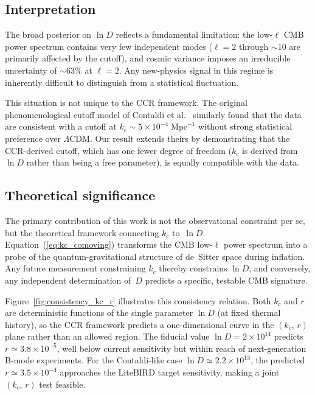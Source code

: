 \subsection{Interpretation}

The broad posterior on $\ln D$ reflects a fundamental limitation: the
low-$\ell$ CMB power spectrum contains very few independent modes
($\ell = 2$ through $\sim 10$ are primarily affected by the cutoff),
and cosmic variance imposes an irreducible uncertainty of $\sim 63\%$
at $\ell = 2$. Any new-physics signal in this regime is inherently
difficult to distinguish from a statistical fluctuation.

This situation is not unique to the CCR framework. The original
phenomenological cutoff model of Contaldi et al.~\cite{Contaldi:2003}
similarly found that the data are consistent with a cutoff at
$k_c \sim 5 \times 10^{-4}\;\mathrm{Mpc}^{-1}$ without strong
statistical preference over $\Lambda$CDM. Our result extends theirs by
demonstrating that the CCR-derived cutoff, which has one fewer degree
of freedom ($k_c$ is derived from $\ln D$ rather than being a free
parameter), is equally compatible with the data.

\subsection{Theoretical significance}

The primary contribution of this work is not the observational
constraint per se, but the theoretical framework connecting $k_c$
to~$\ln D$. Equation~(\ref{eq:kc_comoving}) transforms the CMB
low-$\ell$ power spectrum into a probe of the quantum-gravitational
structure of de~Sitter space during inflation. Any future measurement
constraining $k_c$ thereby constrains $\ln D$, and conversely, any
independent determination of~$D$ predicts a specific, testable CMB
signature.

Figure~\ref{fig:consistency_kc_r} illustrates this consistency
relation. Both $k_c$ and $r$ are deterministic functions of the
single parameter $\ln D$ (at fixed thermal history), so the CCR
framework predicts a one-dimensional curve in the $(k_c,\,r)$ plane
rather than an allowed region. The fiducial value
$\ln D = 2 \times 10^{14}$ predicts $r \simeq 3.8 \times 10^{-5}$,
well below current sensitivity but within reach of next-generation
B-mode experiments. For the Contaldi-like case
$\ln D \simeq 2.2 \times 10^{13}$, the predicted
$r \simeq 3.5 \times 10^{-4}$ approaches the LiteBIRD target
sensitivity, making a joint $(k_c,\,r)$ test feasible.


